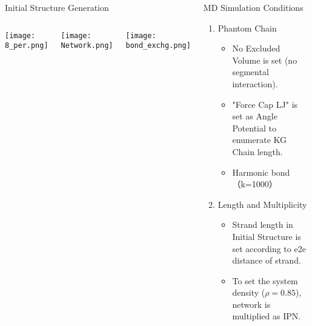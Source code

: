 \begin{columns}[totalwidth=.85\linewidth]
\begin{itembox}[l]{Initial Structure Generation\cite{sasaki}}
            \vspace{-1mm}
            \begin{columns}[T, onlytextwidth]
                    \texttt{[image: 8\_per.png]}
                    \vspace{-5mm}
                    \begin{center}
                        \texttt{[image: Network.png]}
                    \end{center}
                    \texttt{[image: bond\_exchg.png]}
            \end{columns}
        \end{itembox}

        \begin{itembox}[l]{MD Simulation Conditions}
            \begin{enumerate}
                \item Phantom Chain
                    \begin{itemize}
                        \normalsize
                        \item No Excluded Volume is set (no segmental interaction).
                        \item "Force Cap LJ" is set as Angle Potential to enumerate KG Chain length.
                        \item Harmonic bond（k=1000）
                    \end{itemize}
                \item Length and Multiplicity
                    \begin{itemize}
                        \normalsize
                        \item Strand length in Initial Structure is set according to e2e distance of strand.
                        \item To set the system density ($\rho = 0.85$), network is multiplied as IPN.
                    \end{itemize}	
            \end{enumerate}
        \end{itembox}
\end{columns}